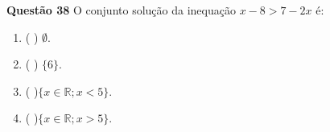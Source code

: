 {\bf Questão 38} 
O conjunto solução da inequação
 $x-8 > 7-2x$ é:
\begin{multicols}{4}
\begin{enumerate}
		\item ( ) $\emptyset$.
		\item ( ) $\{6\}$.
		\item ( )$\{x \in \mathbb{R}; x < 5\}$.
		\item ( )$\{x \in \mathbb{R}; x > 5\}$.
\end{enumerate}
\end{multicols}
